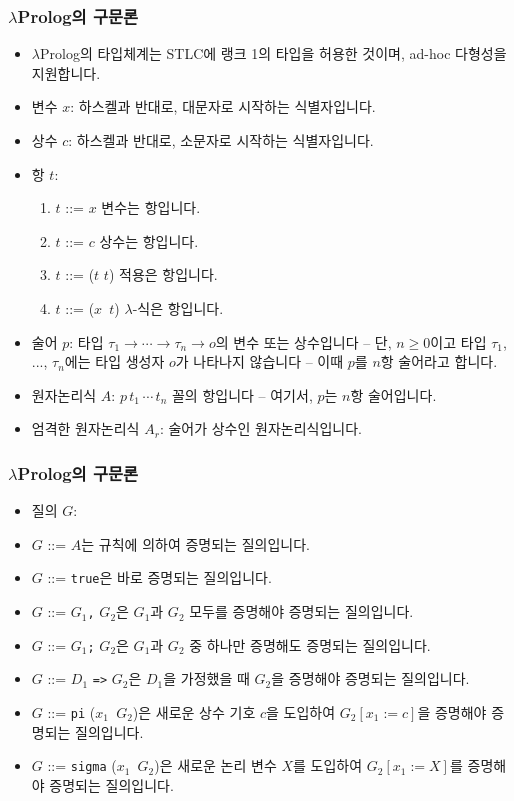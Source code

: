 \documentclass[slidestop,compress,mathserif]{beamer}
\begin{document}
    \begin{frame}
        \frametitle{$\lambda$Prolog의 구문론}
        \begin{itemize}
            \item $\lambda$Prolog의 타입체계는 STLC에 랭크 1의 타입을 허용한 것이며, ad-hoc 다형성을 지원합니다.
            \item 변수 $x$: 하스켈과 반대로, 대문자로 시작하는 식별자입니다.
            \item 상수 $c$: 하스켈과 반대로, 소문자로 시작하는 식별자입니다.
            \item 항 $t$:
            \begin{enumerate}
                \item $t$ ::= $x$ 변수는 항입니다.
                \item $t$ ::= $c$ 상수는 항입니다.
                \item $t$ ::= ($t$ $t$) 적용은 항입니다.
                \item $t$ ::= ($x$\texttt{\string\ }$t$) $\lambda$-식은 항입니다.
            \end{enumerate}
            \item 술어 $p$: 타입 $ \tau_{1} \to \cdots \to \tau_{n} \to o $의 변수 또는 상수입니다 -- 단, $n \geq 0$이고 타입 $\tau_{1}$, ..., $\tau_{n}$에는 타입 생성자 $o$가 나타나지 않습니다 -- 이때 $p$를 $n$항 술어라고 합니다.
            \item 원자논리식 $A$: $p \, t_{1} \, \cdots \, t_{n}$ 꼴의 항입니다 -- 여기서, $p$는 $n$항 술어입니다.
            \item 엄격한 원자논리식 $A_r$: 술어가 상수인 원자논리식입니다.
        \end{itemize}
    \end{frame}

    \begin{frame}
        \frametitle{$\lambda$Prolog의 구문론}
        \begin{itemize}
            \item 질의 $G$:
            \item $G$ ::= $A$는 규칙에 의하여 증명되는 질의입니다.
            \item $G$ ::= \texttt{true}은 바로 증명되는 질의입니다.
            \item $G$ ::= $G_1$\texttt{,} $G_2$은 $G_1$과 $G_2$ 모두를 증명해야 증명되는 질의입니다.
            \item $G$ ::= $G_1$\texttt{;} $G_2$은 $G_1$과 $G_2$ 중 하나만 증명해도 증명되는 질의입니다.
            \item $G$ ::= $D_1$ \texttt{=>} $G_2$은 $D_1$을 가정했을 때 $G_2$을 증명해야 증명되는 질의입니다.
            \item $G$ ::= \texttt{pi} ($x_1$\texttt{\string\ }$G_2$)은 새로운 상수 기호 $c$을 도입하여 $G_2 \left[ x_1 := c \right]$을 증명해야 증명되는 질의입니다.
            \item $G$ ::= \texttt{sigma} ($x_1$\texttt{\string\ }$G_2$)은 새로운 논리 변수 $X$를 도입하여 $G_2 \left[ x_1 := X \right]$를 증명해야 증명되는 질의입니다.
        \end{itemize}
    \end{frame}
\end{document}
